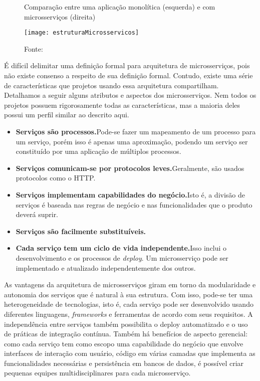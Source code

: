 \begin{figure}[H]
	\centering
	\caption{Comparação entre uma aplicação monolítica (esquerda) e com microsserviços (direita)}
  \texttt{[image: estruturaMicrosservicos]}
	\caption*{Fonte: \cite{lewis}}
\label{fig:estruturaMicrosservicos}
\end{figure}

É difícil delimitar uma definição formal para arquitetura de microsserviços, pois não existe consenso a respeito de sua definição formal. Contudo, existe uma série de características que projetos usando essa arquitetura compartilham. Detalhamos a seguir alguns atributos e aspectos dos microsserviços. Nem todos os projetos possuem rigorosamente todas as características, mas a maioria deles possui um perfil similar ao descrito aqui.

\begin{itemize}
\item \textbf{Serviços são processos.}Pode-se fazer um mapeamento de um processo para um serviço, porém isso é apenas uma aproximação, podendo um serviço ser constituído por uma aplicação de múltiplos processos.
\item \textbf{Serviços comunicam-se por protocolos leves.}Geralmente, são usados protocolos como o HTTP.
\item \textbf{Serviços implementam capabilidades do negócio.}Isto é, a divisão de serviços é baseada nas regras de negócio e nas funcionalidades que o produto deverá suprir.
\item \textbf{Serviços são facilmente substituíveis.}
\item \textbf{Cada serviço tem um ciclo de vida independente.}Isso inclui o desenvolvimento e os processos de \textit{deploy}. Um microsserviço pode ser implementado e atualizado independentemente dos outros.
\end{itemize}

As vantagens da arquitetura de microsserviços giram em torno da modularidade e autonomia dos serviços que é natural à sua estrutura. Com isso, pode-se ter uma heterogeneidade de tecnologias, isto é, cada serviço pode ser desenvolvido usando diferentes linguagens, \textit{frameworks} e ferramentas de acordo com seus requisitos. A independência entre serviços também possibilita o deploy automatizado e o uso de práticas de integração contínua. Também há benefícios de aspecto gerencial: como cada serviço tem como escopo uma capabilidade do negócio que envolve interfaces de interação com usuário, código em várias camadas que implementa as funcionalidades necessárias e persistência em bancos de dados, é possível criar pequenas equipes multidisciplinares para cada microsserviço.


